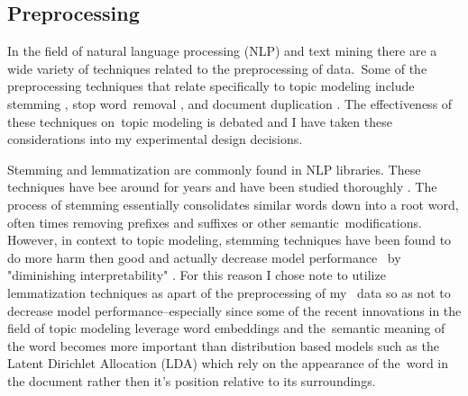 \documentclass[letterpaper,12pt]{article}
\begin{document}
\subsection{Preprocessing}
In the field of natural language processing (NLP) and text mining there are a wide variety of techniques related to the preprocessing of data.\
Some of the preprocessing techniques that relate specifically to topic modeling include stemming \cite{lovins1968development}, stop word\
removal \cite{silva2003importance}, and document duplication \cite{bouayad1999duplication}. The effectiveness of these techniques on\
topic modeling is debated and I have taken these considerations into my experimental design decisions.

Stemming and lemmatization are commonly found in NLP libraries. These techniques have bee around for years and have been studied thoroughly \cite{lovins1968development, kanis2010comparison, jivani2011comparative, larkey2002improving}.
The process of stemming essentially consolidates similar words down into a root word, often times removing prefixes and suffixes or other semantic\
modifications. However, in context to topic modeling, stemming techniques have been found to do more harm then good and actually decrease model performance \cite{schofieldunderstanding} \
by "diminishing interpretability" \cite{boyd2014care}. For this reason I chose note to utilize lemmatization techniques as apart of the preprocessing of my \
data so as not to decrease model performance--especially since some of the recent innovations in the field of topic modeling leverage word embeddings \cite{mikolov2013distributed} and the\
semantic meaning of the word becomes more important than distribution based models such as the Latent Dirichlet Allocation (LDA) \cite{blei2003latent} which rely on the appearance of the\
word in the document rather then it's position relative to its surroundings.
\end{document}
